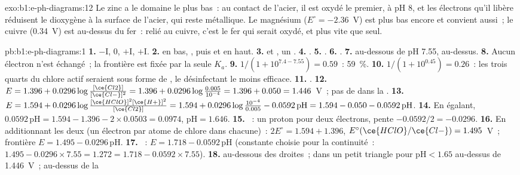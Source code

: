 \begin{solution}{exo:b1:e-ph-diagrams:12}
Le zinc a le domaine le plus bas~: au contact de l'acier, il est oxydé
le premier,  à pH 8, et les électrons
qu'il libère réduisent le dioxygène à la surface de l'acier, qui reste
métallique. Le magnésium ($E^\circ = -2.36$~V) est plus bas encore et
convient aussi~; le cuivre (0.34~V) est au-dessus du fer~: relié au
cuivre, c'est le fer qui serait oxydé, et plus vite que seul.
\end{solution}

\begin{solution}{pb:b1:e-ph-diagrams:1}
\textbf{1.} $-$I, 0, $+$I, $+$I.
\textbf{2.}  en bas, , puis  et  en
haut.
\textbf{3.}  et , un .
\textbf{4.} .
\textbf{5.} .
\textbf{6.} .
\textbf{7.}  au-dessous de pH 7.55,  au-dessus.
\textbf{8.} Aucun électron n'est échangé~; la frontière est fixée par la
seule $K_a$.
\textbf{9.} $1/(1 + 10^{7.4 - 7.55}) = 0.59$~: \qty{59}{\percent}.
\textbf{10.} $1/(1 + 10^{0.45}) = 0.26$~: les trois quarts du chlore
actif seraient sous forme de , le désinfectant le moins
efficace.
\textbf{11.} .
\textbf{12.} $E = 1.396 + 0.0296\log\frac{[\ce{Cl2}]}{[\ce{Cl-}]^2} = 1.396
+ 0.0296\log\frac{0.005}{10^{-4}} = 1.396 + 0.050 = 1.446$~V~; pas de
 dans la .
\textbf{13.} $E = 1.594 + 0.0296\log\frac{[\ce{HClO}]^2[\ce{H+}]^2}{[\ce{Cl2}]}
= 1.594 + 0.0296\log\frac{10^{-4}}{0.005} - 0.0592\,\mathrm{pH} = 1.594 -
0.050 - 0.0592\,\mathrm{pH}$.
\textbf{14.} En égalant, $0.0592\,\mathrm{pH} = 1.594 - 1.396 - 2 \times 0.0503
= 0.0974$, $\mathrm{pH} = 1.646$.
\textbf{15.} ~: un proton pour deux
électrons, pente $-0.0592/2 = -0.0296$.
\textbf{16.} En additionnant les deux  (un électron par
atome de chlore dans chacune)~: $2E^\circ = 1.594 + 1.396$,
$E^\circ(\ce{HClO}/\ce{Cl-}) =
1.495$~V~; frontière $E = 1.495 - 0.0296\,\mathrm{pH}$.
\textbf{17.} ~: $E = 1.718 - 0.0592\,\mathrm{pH}$
(constante choisie pour la continuité~: $1.495 - 0.0296 \times 7.55 = 1.272 = 1.718
- 0.0592 \times 7.55$).
\textbf{18.}  au-dessous des droites~;  dans un petit
triangle pour
$\mathrm{pH} < 1.65$ au-dessus de 1.446~V~;  au-dessus de la

\end{solution}
